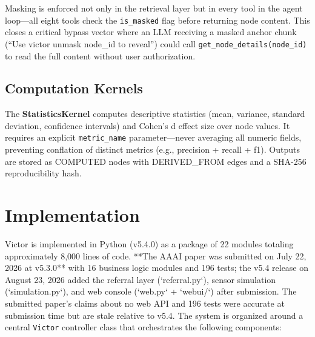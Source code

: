 \documentclass[letterpaper]{article}          %
\theoremstyle{plain}
\theoremstyle{definition}
\theoremstyle{remark}
\begin{document}
Masking is enforced not only in the retrieval layer but in every tool in the
agent loop---all eight tools check the \texttt{is\_masked} flag before returning
node content. This closes a critical bypass vector where an LLM receiving a
masked anchor chunk (``Use victor unmask {node\_id} to reveal'') could call
\texttt{get\_node\_details(node\_id)} to read the full content without user
authorization.

\subsection{Computation Kernels}

The \textbf{StatisticsKernel} computes descriptive statistics (mean, variance,
standard deviation, confidence intervals) and Cohen's d effect size over node
values. It requires an explicit \texttt{metric\_name} parameter---never averaging
all numeric fields, preventing conflation of distinct metrics (e.g., precision +
recall + f1). Outputs are stored as COMPUTED nodes with DERIVED\_FROM edges and
a SHA-256 reproducibility hash.


\section{Implementation}

Victor is implemented in Python (v5.4.0) as a package of 22 modules totaling approximately 8,000 lines of code. **The AAAI paper was submitted on July 22, 2026 at v5.3.0** with 16 business logic modules and 196 tests; the v5.4 release on August 23, 2026 added the referral layer (`referral.py`), sensor simulation (`simulation.py`), and web console (`web.py` + `webui/`) after submission. The submitted paper's claims about no web API and 196 tests were accurate at submission time but are stale relative to v5.4.
The system is organized around a central \texttt{Victor} controller class that
orchestrates the following components:
\end{document}
